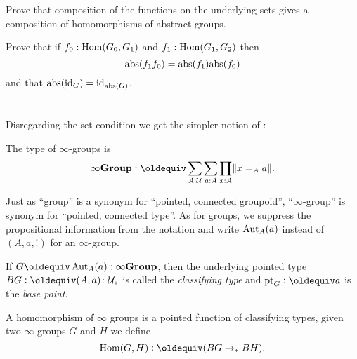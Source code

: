 \begin{xca}
Prove that composition of the functions on the underlying sets gives a composition of homomorphisms of abstract groups.

  Prove that if $f_0:\mathrm{Hom}(G_0,G_1)$ and $f_1:\mathrm{Hom}(G_1,G_2)$ then 
$$\mathrm{abs}(f_1f_0)=\mathrm{abs}(f_1)\mathrm{abs}(f_0)$$ and that $\mathrm{abs}(\mathord{\mathrm{id}}_G)=\mathord{\mathrm{id}}_{\mathrm{abs}(G)}$.
\end{xca}



\section{\texorpdfstring{\inftygps}{∞-groups}}
\label{sec:inftygps}

Disregarding the set-condition we get the simpler notion of \inftygps:
\begin{definition}The type of $\infty$-groups is
  $$\typeinftygp\defequi \sum_{A:\UU}\sum_{a:A}\prod_{x:A}\Trunc{x=_Aa}.$$
\end{definition}

\begin{remark}\label{rem:pointedtypes}
  Just as ``group'' is a synonym for ``pointed, connected groupoid'', ``$\infty$-group'' is synonym for ``pointed, connected type''.  As for groups, we suppress the propositional information from the notation and write $\mathrm{Aut}_A(a)$ instead of $(A,a,!)$ for an $\infty$-group.
\end{remark}

\begin{definition}\label{def:classifyingspace}
  If $G\oldequiv\Aut_A(a):\typeinftygp$, then the underlying pointed type $BG\defequi (A,a)\colon\pttype$ is called the  \emph{classifying type} and $\pt_G\defequi a$ is the \emph{base point}.  
\end{definition}
\begin{definition}
  A homomorphism of $\infty$ groups is a pointed function of classifying types, \ie
  given two $\infty$-groups $G$ and $H$ we define
$$\Hom(G,H)\defequi(BG\to_*BH).$$
\end{definition}





